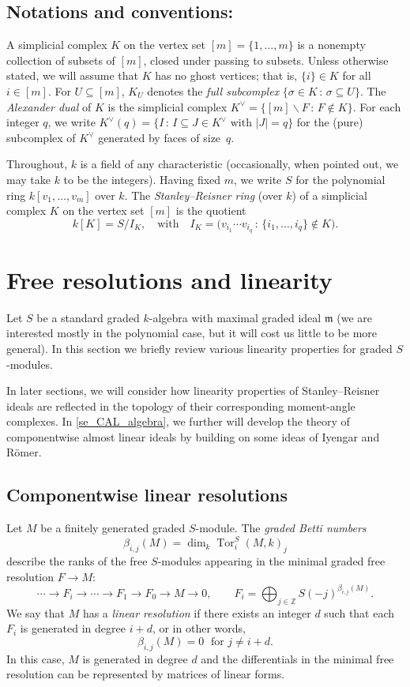 \documentclass[a4paper,10pt]{amsart}
\theoremstyle{definition}
\theoremstyle{remark}
\newcommand{\fm}{\mathfrak{m}}
\DeclareMathOperator{\Tor}{Tor}
\begin{document}
\subsection*{Notations and conventions:}  
A simplicial complex $K$ on the vertex set $[m]=\{1,\ldots,m\}$ is a nonempty collection of subsets of $[m]$, closed under passing to subsets. Unless otherwise stated, we will assume that $K$ has no ghost vertices; that is, $\{i\}\in K$ for all $i\in[m]$. For $U\subseteq [m]$, $K_U$ denotes the \emph{full subcomplex} $\{\sigma\in K \,:\, \sigma\subseteq U\}$.
The \emph{Alexander dual} of $K$ is the simplicial complex $K^\vee=\big\{ [m]\smallsetminus F \, :\, F\notin K\big\}$. For each integer $q$, we write $K^\vee(q)=\{I\, :\, I\subseteq J\in K^\vee\text{ with }|J|=q\}$ for the (pure) subcomplex of $K^\vee$ generated by faces of size~$q$.

Throughout, $k$ is a field of any characteristic (occasionally, when pointed out, we may take $k$ to be the integers). Having fixed $m$, we write $S$ for the polynomial ring $k[v_1,\ldots,v_m]$ over $k$. The \emph{Stanley--Reisner ring} (over $k$)  of a simplicial complex $K$ on the vertex set $[m]$ is the quotient
\[
k[K]=S/I_K,\quad \text{with}\quad I_K=\big(v_{i_1}\!\cdots v_{i_q} \,:\, \{i_1,\ldots,i_q\} \notin K\big).
\] 



\section{Free resolutions and linearity}
\label{se_lin_background}
Let $S$ be a standard graded $k$-algebra with maximal graded ideal $\fm$ (we are interested mostly in the polynomial case, but it will cost us little to be more general). In this section we briefly review various linearity properties for graded $S$-modules. 

In later sections, we will consider how linearity properties of Stanley--Reisner ideals are reflected in the topology of their corresponding moment-angle complexes. In \cref{se_CAL_algebra}, we further will develop the theory of componentwise almost linear ideals by building on some ideas of Iyengar and R\"omer.


\subsection*{Componentwise linear resolutions} Let $M$ be a finitely generated graded $S$-module. The \emph{graded Betti numbers} 
\[ \beta_{i,j}(M)=\dim_k\Tor^S_{i}(M,k)_j \]
describe the ranks of the free $S$-modules appearing in  the minimal graded free resolution $F\to M$:\\ 
\[
\cdots\to F_{i} \to\cdots\to F_1 \to F_0 \to M \to 0, \qquad F_{i} = \bigoplus_{j\in\mathbb{Z}}S(-j)^{\beta_{i,j}(M)}.
\]
We say that $M$ has a \emph{linear resolution}
if there exists an integer $d$ such that each $F_i$ is generated in degree $i+d$, or in other words,
\[ \beta_{i,j}(M)=0 \; \text{ for } j\neq i+d. \]
In this case, $M$ is generated in degree $d$ and the differentials in the minimal free resolution can be represented by matrices of linear forms.
\end{document}
